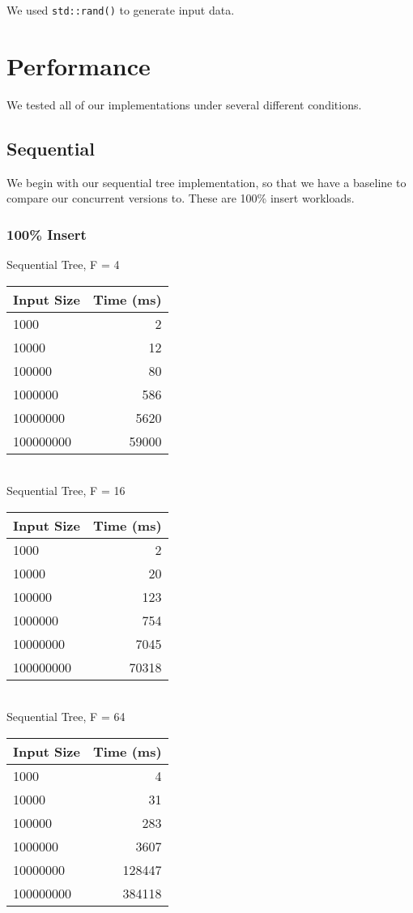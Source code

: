 \documentclass{sig-alternate}
\begin{document}
We used \texttt{std::rand()} to generate input data.  

\section{Performance}
We tested all of our implementations under several different conditions.

\subsection{Sequential}
We begin with our sequential tree implementation, so that we have a baseline to compare our concurrent versions to.  These are 100\% insert workloads.
\subsubsection{100\% Insert}
Sequential Tree, F = 4\\
\begin{tabular}{| l | r |}
  \hline
  Input Size & Time (ms)\\  \hline
  1000			&	2	\\
  10000			&	12	\\
  100000		&	80	\\
  1000000		&	586	\\
  10000000		&	5620	\\
  100000000		&	59000	\\
  \hline
\end{tabular} \\

Sequential Tree, F = 16\\
\begin{tabular}{| l | r |}
  \hline
  Input Size & Time (ms)\\  \hline
  1000			&	2	\\
  10000			&	20	\\
  100000		&	123	\\
  1000000		&	754	\\
  10000000		&	7045	\\
  100000000		&	70318	\\
  \hline
\end{tabular} \\

Sequential Tree, F = 64\\
\begin{tabular}{| l | r |}
  \hline
  Input Size & Time (ms)\\  \hline
  1000			&	4	\\
  10000			&	31	\\
  100000		&	283	\\
  1000000		&	3607	\\
  10000000		&	128447	\\
  100000000		&	384118\\
  \hline
\end{tabular} \\
\end{document}
